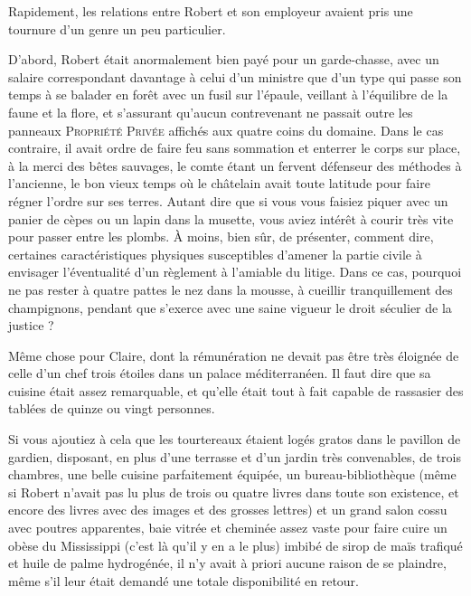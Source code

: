 Rapidement, les relations entre Robert et son employeur avaient pris une tournure d’un genre un peu particulier.

D’abord, Robert était anormalement bien payé pour un garde-chasse, avec un salaire correspondant davantage à celui d’un ministre que d’un type qui passe son temps à se balader en forêt avec un fusil sur l’épaule, veillant à l’équilibre de la faune et la flore, et s’assurant qu’aucun contrevenant ne passait outre les panneaux \textsc{Propriété Privée} affichés aux quatre coins du domaine. Dans le cas contraire, il avait ordre de faire feu sans sommation et enterrer le corps sur place, à la merci des bêtes sauvages, le comte étant un fervent défenseur des méthodes à l’ancienne, le bon vieux temps où le châtelain avait toute latitude pour faire régner l’ordre sur ses terres. Autant dire que si vous vous faisiez piquer avec un panier de cèpes ou un lapin dans la musette, vous aviez intérêt à courir très vite pour passer entre les plombs. À moins, bien sûr, de présenter, comment dire, certaines caractéristiques physiques susceptibles d’amener la partie civile à envisager l’éventualité d’un règlement à l’amiable du litige. Dans ce cas, pourquoi ne pas rester à quatre pattes le nez dans la mousse, à cueillir tranquillement des champignons, pendant que s’exerce avec une saine vigueur le droit séculier de la justice ?

Même chose pour Claire, dont la rémunération ne devait pas être très éloignée de celle d’un chef trois étoiles dans un palace méditerranéen. Il faut dire que sa cuisine était assez remarquable, et qu’elle était tout à fait capable de rassasier des tablées de quinze ou vingt personnes.

Si vous ajoutiez à cela que les tourtereaux étaient logés gratos dans le pavillon de gardien, disposant, en plus d’une terrasse et d’un jardin très convenables, de trois chambres, une belle cuisine parfaitement équipée, un bureau-bibliothèque (même si Robert n’avait pas lu plus de trois ou quatre livres dans toute son existence, et encore des livres avec des images et des grosses lettres) et un grand salon cossu avec poutres apparentes, baie vitrée et cheminée assez vaste pour faire cuire un obèse du Mississippi (c’est là qu’il y en a le plus) imbibé de sirop de maïs trafiqué et huile de palme hydrogénée, il n’y avait à priori aucune raison de se plaindre, même s’il leur était demandé une totale disponibilité en retour.


